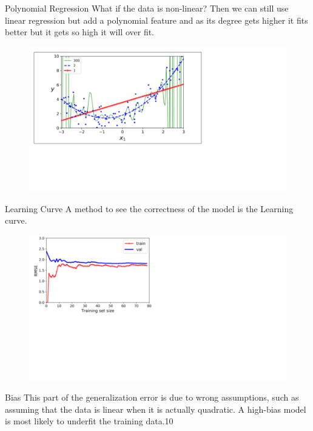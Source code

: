 \documentclass{beamer}
\begin{document}
\begin{frame}{Polynomial Regression}
What if the data is non-linear? Then we can still use linear regression but add a polynomial feature and as its degree gets higher it fits better but it gets so high it will over fit. 
\begin{figure}
\begin{center}
\centering
  \includegraphics[totalheight=1\textheight]{Learning Curve.png}
\end{center}
\end{figure}
\end{frame}
\begin{frame}{Learning Curve}
A method to see the correctness of the model is the Learning curve.
\begin{figure}
\begin{center}
\centering
  \includegraphics[totalheight=1\textheight]{Learning curve_trainval.png}
\end{center}
\end{figure}
\end{frame}
\begin{frame}{Bias}
This part of the generalization error is due to wrong assumptions, such as assuming that the data is linear when it is actually quadratic. A high-bias model is most likely to underfit the training data.10 
\end{frame}
\end{document}
